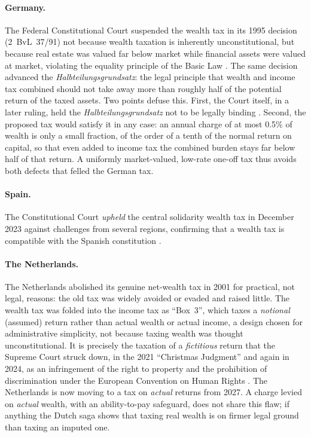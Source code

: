 \documentclass[../../main]{subfiles}
\begin{document}
\paragraph{Germany.} The Federal Constitutional Court suspended the wealth tax in its 1995 decision (2~BvL~37/91) not because wealth taxation is inherently unconstitutional, but because real estate was valued far below market while financial assets were valued at market, violating the equality principle of the Basic Law \citep{BVerfG1995}. The same decision advanced the \emph{Halbteilungsgrundsatz}: the legal principle that wealth and income tax combined should not take away more than roughly half of the potential return of the taxed assets. Two points defuse this. First, the Court itself, in a later ruling, held the \emph{Halbteilungsgrundsatz} not to be legally binding \citep{DGTaxud2026}. Second, the proposed tax would satisfy it in any case: an annual charge of at most 0.5\% of wealth is only a small fraction, of the order of a tenth of the normal return on capital, so that even added to income tax the combined burden stays far below half of that return. A uniformly market-valued, low-rate one-off tax thus avoids both defects that felled the German tax.

\paragraph{Spain.} The Constitutional Court \emph{upheld} the central solidarity wealth tax in December 2023 against challenges from several regions, confirming that a wealth tax is compatible with the Spanish constitution \citep{STC2023}.

\paragraph{The Netherlands.} %
The Netherlands abolished its genuine net-wealth tax in 2001 for practical, not legal, reasons: the old tax was widely avoided or evaded and raised little. The wealth tax was folded into the income tax as ``Box~3'', which taxes a \emph{notional} (assumed) return rather than actual wealth or actual income, a design chosen for administrative simplicity, not because taxing wealth was thought unconstitutional. It is precisely the taxation of a \emph{fictitious} return that the Supreme Court struck down, in the 2021 ``Christmas Judgment'' and again in 2024, as an infringement of the right to property and the prohibition of discrimination under the European Convention on Human Rights \citep{HogeRaad2021}. The Netherlands is now moving to a tax on \emph{actual} returns from 2027. A charge levied on \emph{actual} wealth, with an ability-to-pay safeguard, does not share this flaw; if anything the Dutch saga shows that taxing real wealth is on firmer legal ground than taxing an imputed one.
\end{document}
